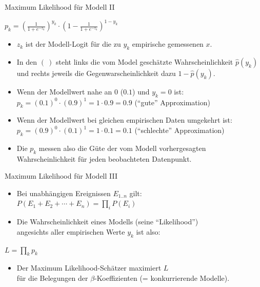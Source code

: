 \begin{frame}
  {Maximum Likelihood für Modell II}
  \begin{center}
    $p_k=(\frac{1}{1+e^{-z_k}})^{y_k}\cdot(1-\frac{1}{1+e^{-z_k}})^{1-y_k}$
  \end{center}
  \begin{itemize}[<+->]
    \item $z_k$ ist der Modell-Logit für die zu $y_k$ empirische gemessenen $x$.
    \item In den $(~)$ steht \alert{links die vom Model geschätzte Wahrscheinlichkeit $\hat{p}(y_k)$}\\
      und \alert{rechts jeweils die Gegenwarscheinlichkeit dazu $1-\hat{p}(y_k)$}.
    \item Wenn der Modellwert nahe an $0$ (\zB $0.1$) und $y_k=0$ ist:\\
      \alert{$p_k=(0.1)^0\cdot(0.9)^1=1\cdot 0.9=0.9$} ("`gute"' Approximation)
    \item Wenn der Modellwert bei gleichen empirischen Daten umgekehrt ist:\\
      \alert{$p_k=(0.9)^0\cdot(0.1)^1=1\cdot 0.1=0.1$} ("`schlechte"' Approximation)
    \item Die $p_k$ messen also die Güte der vom Modell vorhergesagten\\
      Wahrscheinlichkeit für jeden beobachteten Datenpunkt.
  \end{itemize}
\end{frame}

\begin{frame}
  {Maximum Likelihood für Modell III}
  \begin{itemize}[<+->]
    \item Bei unabhängigen Ereignissen $E_{1..n}$ gilt:\\
      $P(E_1+E_2+\cdots+E_n)=\prod\limits_i P(E_i)$
    \item Die Wahrscheinlichkeit eines Modells (seine "`Likelihood"')\\
      angesichts aller empirischen Werte $y_k$ ist also:
  \end{itemize}
  \pause
  \begin{center}
    \alert{$L=\prod\limits_k p_k$}
  \end{center}
  \pause
  \begin{itemize}[<+->]
    \item Der Maximum Likelihood-Schätzer maximiert $L$\\
      für die Belegungen der $\beta$-Koeffizienten (= konkurrierende Modelle).
  \end{itemize}
\end{frame}

